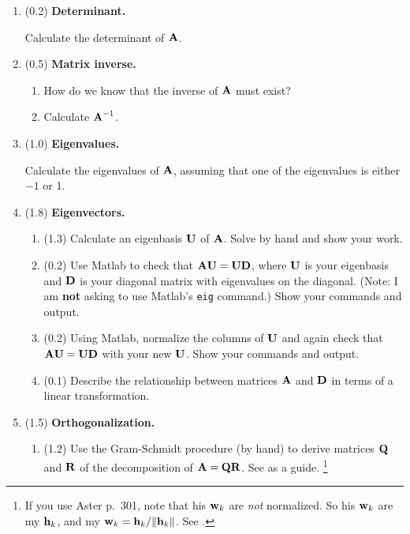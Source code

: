 \begin{enumerate}
\item (0.2) {\bf Determinant.}

Calculate the determinant of $\mbox{${\bf A}$}$.

\item (0.5) {\bf Matrix inverse.}

\begin{enumerate}
\item How do we know that the inverse of $\mbox{${\bf A}$}$ must exist?
\item Calculate $\mbox{${\bf A}$}^{-1}$.
\end{enumerate}

\item (1.0) {\bf Eigenvalues.}

Calculate the eigenvalues of $\mbox{${\bf A}$}$, assuming that one of the eigenvalues is either $-1$ or 1.

\item (1.8) {\bf Eigenvectors.}

\begin{enumerate}
\item (1.3) Calculate an eigenbasis $\mbox{${\bf U}$}$ of $\mbox{${\bf A}$}$. Solve by hand and show your work.

\item (0.2) Use Matlab to check that $\mbox{${\bf A}$}\mbox{${\bf U}$} = \mbox{${\bf U}$}\mbox{${\bf D}$}$, where $\mbox{${\bf U}$}$ is your eigenbasis and $\mbox{${\bf D}$}$ is your diagonal matrix with eigenvalues on the diagonal. (Note: I am {\bf not} asking to use Matlab's \verb+eig+ command.) Show your commands and output.

\item (0.2) Using Matlab, normalize the columns of $\mbox{${\bf U}$}$ and again check that $\mbox{${\bf A}$}\mbox{${\bf U}$} = \mbox{${\bf U}$}\mbox{${\bf D}$}$ with your new $\mbox{${\bf U}$}$. Show your commands and output.

\item (0.1) Describe the relationship between matrices $\mbox{${\bf A}$}$ and $\mbox{${\bf D}$}$ in terms of a linear transformation.

\end{enumerate}

\pagebreak
\item (1.5) {\bf Orthogonalization.}

\begin{enumerate}
\item (1.2) Use the Gram-Schmidt procedure (by hand) to derive matrices $\mbox{${\bf Q}$}$ and $\mbox{${\bf R}$}$ of the decomposition of $\mbox{${\bf A}$} = \mbox{${\bf Q}$}\mbox{${\bf R}$}$. See  as a guide.
\footnote{If you use Aster p.~301, note that his $\mbox{${\bf w}$}_k$ are {\em not} normalized. So his $\mbox{${\bf w}$}_k$ are my $\mbox{${\bf h}$}_k$, and my $\mbox{${\bf w}$}_k = \mbox{${\bf h}$}_k/\|\mbox{${\bf h}$}_k\|$. See .}


\end{enumerate}
\end{enumerate}
